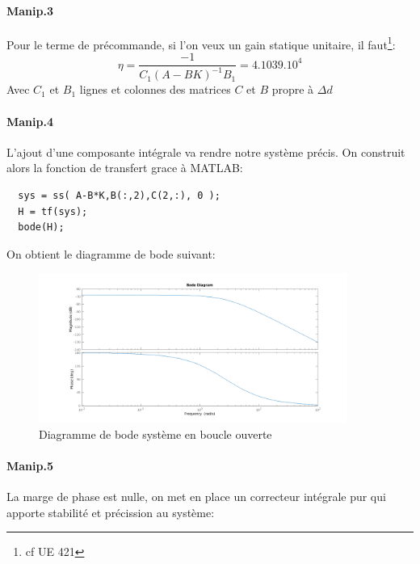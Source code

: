\documentclass[10pt,a4paper,notitlepage]{article}
\begin{document}
\paragraph{Manip.3}
Pour le terme de précommande, si l'on veux un gain statique unitaire, il faut\footnote{cf UE 421}:
\[
  \eta =\frac{-1}{C_1(A-BK)^{-1}B_1} = 4.1039. 10^{4}
\]
Avec $C_1$ et  $B_1$ lignes et colonnes des matrices $C$ et $B$ propre à $\Delta d$
\paragraph{Manip.4} L'ajout d'une composante intégrale va rendre notre système précis. On construit alors la fonction de transfert grace à MATLAB:
\begin{verbatim}
  sys = ss( A-B*K,B(:,2),C(2,:), 0 );
  H = tf(sys);
  bode(H);
\end{verbatim}
On obtient le diagramme de bode suivant:
\begin{figure}[ht]
  \centering
  \includegraphics[width=0.9\textwidth]{manip_5_bode.png}
  \caption{Diagramme de bode système en boucle ouverte}
  \label{fig:label}
\end{figure}
\paragraph{Manip.5}
La marge de phase est nulle, on met en place un correcteur intégrale pur qui apporte stabilité et précission au système:
\end{document}
